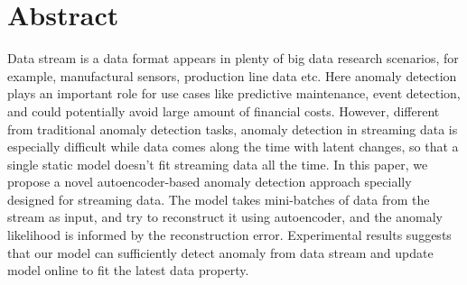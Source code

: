 \chapter*{Abstract}
\label{chap:abstract}
Data stream is a data format appears in plenty of big data research scenarios, for example, manufactural sensors, production line data etc. Here anomaly detection plays an important role for use cases like predictive maintenance, event detection, and could potentially avoid large amount of financial costs. However, different from traditional anomaly detection tasks, anomaly detection in streaming data is especially difficult while data comes along the time with latent changes, so that a single static model doesn’t fit streaming data all the time. 
In this paper, we propose a novel autoencoder-based anomaly detection approach specially designed for streaming data. The model takes mini-batches of data from the stream as input, and try to reconstruct it using autoencoder, and the anomaly likelihood is informed by the reconstruction error. Experimental results suggests that our model can sufficiently detect anomaly from data stream and update model online to fit the latest data property.
